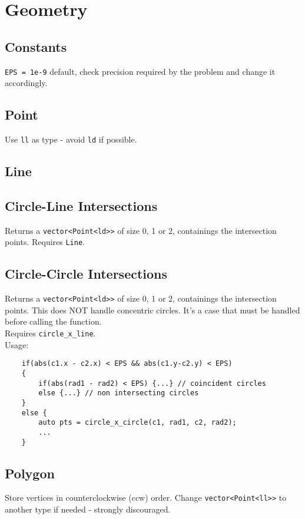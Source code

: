 \section{Geometry}

\subsection{Constants}
\verb|EPS = 1e-9| default, check precision required by the problem and
change it accordingly.


\subsection{Point}
Use \verb|ll| as type - avoid \verb|ld| if possible.

\subsection{Line}

\subsection{Circle-Line Intersections}
Returns a \verb|vector<Point<ld>>| of size 0, 1 or 2, containings the intersection points.
Requires \verb|Line|.


\subsection{Circle-Circle Intersections}
Returns a \verb|vector<Point<ld>>| of size 0, 1 or 2, containings the intersection points.
This does NOT handle concentric circles. It's a case that must be handled before calling the function.\\
Requires \verb|circle_x_line|.\\
Usage:
\begin{lstlisting}
	if(abs(c1.x - c2.x) < EPS && abs(c1.y-c2.y) < EPS)
	{
		if(abs(rad1 - rad2) < EPS) {...} // coincident circles
		else {...} // non intersecting circles
	}
	else {
		auto pts = circle_x_circle(c1, rad1, c2, rad2);
		...
	}
\end{lstlisting}


\subsection{Polygon}
Store vertices in counterclockwise (ccw) order.
Change \verb|vector<Point<ll>>| to another type if needed - strongly discouraged.

